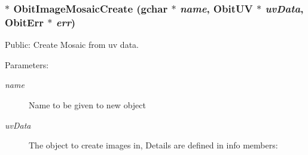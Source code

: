\subsubsection{$\ast$ Obit\-Image\-Mosaic\-Create (gchar $\ast$ {\em name}, {\bf Obit\-UV} $\ast$ {\em uv\-Data}, {\bf Obit\-Err} $\ast$ {\em err})}\label{ObitImageMosaic_8h_a17}


Public: Create Mosaic from uv data. 

\begin{Desc}
\item[Parameters:]
\begin{description}
\item[{\em name}]Name to be given to new object \item[{\em uv\-Data}]The object to create images in, Details are defined in info members: \begin{itemize}

\end{itemize}
\end{description}
\end{Desc}

